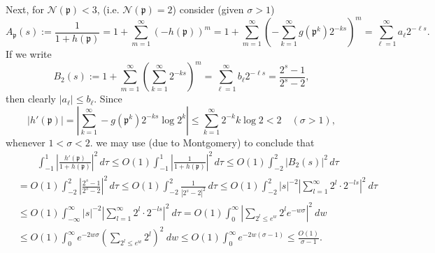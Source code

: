 \documentclass[11pt]{amsart}
\theoremstyle{definition}
\newcommand{\NN}{{\mathcal N}}
\newcommand{\mf}{\mathfrak}
\newcommand{\WS}[1]{{\color{blue}{{#1}}}}
\begin{document}
 Next, for $\NN(\mf p)<3$, (i.e. $\NN(\mf p)=2$) consider (given $\sigma>1$)
 $$A_{\mf p}(s):=\frac{1}{1+h(\mf p)}=1+\sum_{m=1}^{\infty}(-h(\mf p))^{m}=1+\sum_{m=1}^{\infty}\left(-\sum_{k=1}^{\infty}g(\mf p^{k})2^{-ks}\right)^{m}=\sum_{\ell=1}^{\infty} a_{\ell}2^{-\ell s}.$$
If we write
 $$B_{2}(s):=1+\sum_{m=1}^{\infty}\left(\sum_{k=1}^{\infty}2^{-ks}\right)^{m}=\sum_{\ell=1}^{\infty} b_{\ell}2^{-\ell s} = \frac{2^s-1}{2^s-2},$$
 then clearly $\vert a_{\ell}\vert\leq b_{\ell}$.
Since
 \[
 |h'(\mf p)| = \left| \sum_{k=1}^{\infty}-g(\mf p^k)2^{-ks} \log 2^k \right| \leq \sum_{k=1}^{\infty} 2^{-k}k\log 2 <2\quad  (\sigma>1),
 \]
  whenever $1<\sigma<2$.
 we may use \cite[Lemma~6.5]{E79book} (due to Montgomery) to conclude 
 that 
  \begin{equation}\label{sdvv}
    \begin{split}
      &\qquad \int_{-1}^{1}\left|\frac{h'(\mf p)}{1+h(\mf p)}\right|^{2}\,d\tau
       \leq O(1)\int_{-1}^{1}\left|\frac{1}{1+h(\mf p)}\right|^{2}\,d\tau
       \leq O(1)\int_{-2}^{2}\left| B_{2}(s)\right|^{2}\,d\tau
       \\&=O(1)\int_{-2}^{2}\left| \frac{2^{s}-1}{2^{s}-2}\right|^{2}\,d\tau
       \leq O(1)\int_{-2}^{2}\frac{1}{\left| 2^{s}-2\right|^{2}}\,d\tau \leq O(1) \int_{-2}^2 |s|^{-2} \left| \sum_{l=1}^{\infty} 2^l\cdot 2^{-ls}\right|^2 \ d\tau \\& \leq O(1)\int_{-\infty}^{\infty} |s|^{-2} \left| \sum_{l=1}^{\infty} 2^l \cdot 2^{-ls} \right|^2 \ d\tau = O(1) \int_{0}^{\infty} \left| \sum_{2^l\leq e^w} 2^le^{-w\sigma}\right|^2 \ dw \\&\leq O(1) \int_{0}^{\infty} e^{-2w\sigma} \left(\sum_{2^l \leq e^w} 2^l\right)^2 \ dw  \leq O(1) \int_{0}^{\infty} e^{-2w(\sigma-1)} \leq \frac{O(1)}{\sigma-1}.
    \end{split}
 \end{equation}
 
\end{document}

